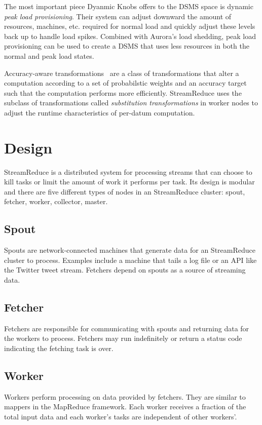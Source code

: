 \documentclass[12pt,twocolumn]{article}
\begin{document}
The most important piece Dyanmic Knobs offers to the DSMS space is dynamic
\emph{peak load provisioning}. Their system can adjust downward the amount of resources,
machines, etc. required for normal load and quickly adjust these levels back up to
handle load spikes. Combined with Aurora's load shedding, peak load provisioning can
be used to create a DSMS that uses less resources in both the normal and peak load
states.

Accuracy-aware transformations~\cite{Zhu:2012:RAP:2103656.2103710} are a class of transformations
that alter a computation according to a set of probabilstic weights and an accuracy
target such that the computation performs more efficiently. StreamReduce uses the subclass
of transformations called \emph{substitution transformations} in worker nodes to adjust
the runtime characteristics of per-datum computation.

\section{Design}
\label{sec:design}
StreamReduce is a distributed system for processing streams that can choose to kill tasks or
limit the amount of work it performs per task. Its design is modular and there are five
different types of nodes in an StreamReduce cluster: spout, fetcher, worker, collector, master.
\subsection{Spout}
Spouts are network-connected machines that generate data for an StreamReduce cluster to process.
Examples include a machine that tails a log file or an API like the Twitter tweet
stream. Fetchers depend on spouts as a source of streaming data.
\subsection{Fetcher}
Fetchers are responsible for communicating with spouts and returning data for the
workers to process. Fetchers may run indefinitely or return a status code indicating
the fetching task is over.
\subsection{Worker}
Workers perform processing on data provided by fetchers. They are similar to mappers
in the MapReduce framework. Each worker receives a fraction of the total input data
and each worker's tasks are independent of other workers'.
\end{document}
